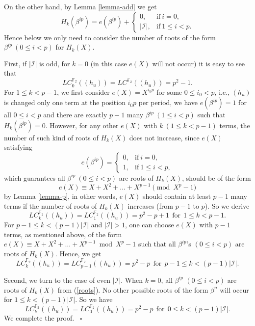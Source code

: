 \documentclass [11pt,a4paper]{article}
\def\F{\mathbb{F}}
\begin{document}
 On the other hand, by Lemma \ref{lemma-add} we get
\begin{equation}\label{roots}
H_k(\beta^{ip})=e(\beta^{ip})+\left\{
\begin{array}{ll}
0, & \mathrm{if}~ i= 0,\\
|\mathcal{I}|, & \mathrm{if}~ 1\le i<p.
\end{array}
\right.
\end{equation}
Hence below we only need to consider the number of roots of the form $\beta^{ip}  ~ (0\le i<p)$ for $H_k(X)$.

First, if $|\mathcal{I}|$ is odd, for $k=0$ (in this case $e(X)$ will not occur) it is easy to see that
$$
LC^{\F_2}_0((h_u))=LC^{\F_2}((h_u))=p^2-1.
$$
For $1\le k<p-1$, we first consider $e(X)=X^{i_0 p}$ for some $0\le i_0<p$, i.e., $(h_u)$ is changed only one term at the position $i_0 p$ per period, we have $e(\beta^{ip})=1$ for all $0\le i<p$ and there are exactly $p-1$ many $\beta^{ip}  ~ (1\le i<p)$ such that $H_k(\beta^{ip})=0$. However, for any other $e(X)$ with $k~ (1\le k<p-1)$ terms, the number of such kind of roots of $H_k(X)$ does not increase, since  $e(X)$ satisfying
$$
e(\beta^{ip})=\left\{
\begin{array}{ll}
0, & \mathrm{if}~ i= 0,\\
1, & \mathrm{if}~ 1\le i<p,
\end{array}
\right.
$$
which guarantees all $\beta^{ip} ~(0\le i<p)$ are roots of $H_k(X)$, should be of the form
$$
e(X)\equiv  X+X^2+\ldots+X^{p-1} \pmod {X^p-1}
$$
by Lemma \ref{lemma-p}, in other words, $e(X)$ should contain at least $p-1$ many terms if the number of roots of  $H_k(X)$ increases (from $p-1$ to $p$). So we derive
$$
LC^{\F_2}_k((h_u))=LC^{\F_2}_1((h_u))=p^2-p+1  ~~\mathrm{for}~~ 1\le k<p-1.
$$
For $p-1\le k< (p-1)|\mathcal{I}|$ and $|\mathcal{I}|>1$, one can choose $e(X)$ with $p-1$ terms, as mentioned above,  of the form $e(X)\equiv  X+X^2+\ldots+X^{p-1} \bmod {X^p-1}$ such that all $\beta^{ip}$'s  $(0\le i<p)$ are roots of $H_k(X)$.  Hence, we get
$$
LC^{\F_2}_k((h_u))=LC^{\F_2}_{p-1}((h_u))=p^2-p  ~~\mathrm{for}~~ p-1\le k< (p-1)|\mathcal{I}|.
$$


Second, we turn to the case of even $|\mathcal{I}|$. When $k=0$, all $\beta^{ip}$ $(0\le i<p)$ are roots of  $H_k(X)$ from (\ref{roots}). No other possible roots of the form $\beta^{n}$ will occur for $1\le k< (p-1)|\mathcal{I}|$.
So we have
$$
LC^{\F_2}_k((h_u))=LC^{\F_2}_0((h_u))=p^2-p ~~\mathrm{for}~~ 0\le k< (p-1)|\mathcal{I}|.
$$
We complete the proof.   ~\hfill $\square$\\
\end{document}
